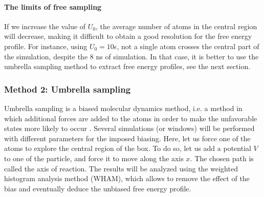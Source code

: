 \documentclass[9pt,tutorial]{livecoms}
\begin{document}
\paragraph{The limits of free sampling}
If we increase the value of $U_0$, the average number of atoms in the central region will decrease, making it difficult to obtain a good resolution for the free energy profile. For instance, using $U_0 = 10 \epsilon$, not a single atom crosses the central part of the simulation, despite the 8 ns of simulation. In that case, it is better to use the umbrella sampling method to extract free energy profiles, see the next section.

\subsubsection{Method 2: Umbrella sampling}
Umbrella sampling is a biased molecular dynamics method, i.e. a method in which additional forces are added to the atoms in order to make the unfavorable states more likely to occur \cite{frenkel2023understanding}. Several simulations (or windows) will be performed with different parameters for the imposed biasing. Here, let us force one of the atoms to explore the central region of the box. To do so, let us add a potential $V$ to one of the particle, and force it to move along the axis $x$. The chosen path is called the axis of reaction. The results will be analyzed using the weighted histogram analysis method (WHAM), which allows to remove the effect of the bias and eventually deduce the unbiased free energy profile.
\end{document}
